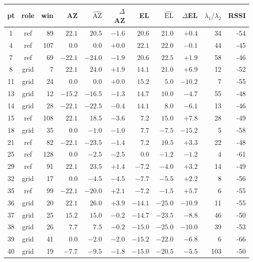 \documentclass[11pt,a4paper]{article}
\begin{document}
\begin{center}\small
\begin{tabular}{ccr rrr rrr rr}
\toprule
pt & role & win & AZ & $\widehat{\mathrm{AZ}}$ & $\Delta$AZ & EL & $\widehat{\mathrm{EL}}$ & $\Delta$EL & $\lambda_1/\lambda_2$ & RSSI \\
\midrule
1 & ref & 89 & $22.1$ & $20.5$ & $-1.6$ & $20.6$ & $21.0$ & $+0.4$ & 34 & -54 \\
4 & ref & 107 & $0.0$ & $0.0$ & $+0.0$ & $22.1$ & $22.0$ & $-0.1$ & 44 & -45 \\
7 & ref & 69 & $-22.1$ & $-24.0$ & $-1.9$ & $20.6$ & $22.5$ & $+1.9$ & 58 & -46 \\
8 & grid & 7 & $22.1$ & $24.0$ & $+1.9$ & $14.1$ & $21.0$ & $+6.9$ & 12 & -52 \\
11 & grid & 24 & $0.0$ & $0.0$ & $+0.0$ & $15.2$ & $5.0$ & $-10.2$ & 7 & -55 \\
13 & grid & 12 & $-15.2$ & $-16.5$ & $-1.3$ & $14.7$ & $10.0$ & $-4.7$ & 55 & -48 \\
14 & grid & 28 & $-22.1$ & $-22.5$ & $-0.4$ & $14.1$ & $8.0$ & $-6.1$ & 13 & -46 \\
15 & ref & 108 & $22.1$ & $18.5$ & $-3.6$ & $7.2$ & $15.0$ & $+7.8$ & 28 & -49 \\
18 & grid & 35 & $0.0$ & $-1.0$ & $-1.0$ & $7.7$ & $-7.5$ & $-15.2$ & 5 & -58 \\
21 & ref & 82 & $-22.1$ & $-23.5$ & $-1.4$ & $7.2$ & $10.5$ & $+3.3$ & 22 & -48 \\
25 & ref & 128 & $0.0$ & $-2.5$ & $-2.5$ & $0.0$ & $-1.2$ & $-1.2$ & 4 & -61 \\
29 & ref & 91 & $22.1$ & $23.5$ & $+1.4$ & $-7.2$ & $-4.0$ & $+3.2$ & 14 & -49 \\
32 & grid & 17 & $0.0$ & $-4.5$ & $-4.5$ & $-7.7$ & $-5.5$ & $+2.2$ & 8 & -56 \\
35 & ref & 99 & $-22.1$ & $-20.0$ & $+2.1$ & $-7.2$ & $-1.5$ & $+5.7$ & 6 & -55 \\
36 & grid & 20 & $22.1$ & $26.0$ & $+3.9$ & $-14.1$ & $-25.0$ & $-10.9$ & 11 & -55 \\
37 & grid & 25 & $15.2$ & $15.0$ & $-0.2$ & $-14.7$ & $-23.5$ & $-8.8$ & 46 & -50 \\
38 & grid & 26 & $7.7$ & $7.5$ & $-0.2$ & $-15.0$ & $-25.0$ & $-10.0$ & 39 & -53 \\
39 & grid & 41 & $0.0$ & $-2.0$ & $-2.0$ & $-15.2$ & $-22.0$ & $-6.8$ & 6 & -66 \\
40 & grid & 19 & $-7.7$ & $-9.5$ & $-1.8$ & $-15.0$ & $-20.5$ & $-5.5$ & 103 & -50 \\

\end{tabular}
\end{center}
\end{document}
